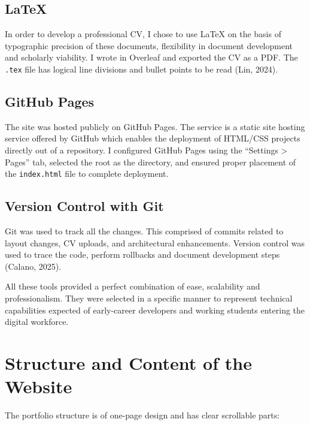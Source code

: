 \documentclass[11pt,a4paper]{article}
\begin{document}
\subsection*{LaTeX}

In order to develop a professional CV, I chose to use LaTeX on the basis of typographic precision of these documents, flexibility in document development and scholarly viability. I wrote in Overleaf and exported the CV as a PDF. The \texttt{.tex} file has logical line divisions and bullet points to be read (Lin, 2024).

\subsection*{GitHub Pages}

The site was hosted publicly on GitHub Pages. The service is a static site hosting service offered by GitHub which enables the deployment of HTML/CSS projects directly out of a repository. I configured GitHub Pages using the “Settings > Pages” tab, selected the root as the directory, and ensured proper placement of the \texttt{index.html} file to complete deployment.

\subsection*{Version Control with Git}

Git was used to track all the changes. This comprised of commits related to layout changes, CV uploads, and architectural enhancements. Version control was used to trace the code, perform rollbacks and document development steps (Calano, 2025).

All these tools provided a perfect combination of ease, scalability and professionalism. They were selected in a specific manner to represent technical capabilities expected of early-career developers and working students entering the digital workforce.
\section*{Structure and Content of the Website}

The portfolio structure is of one-page design and has clear scrollable parts:
\end{document}
